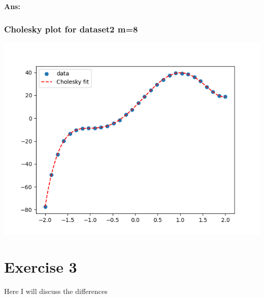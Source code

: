 \documentclass[11pt]{article}
\newenvironment{solbox}
  {\begin{mdframed}[linewidth=1pt,linecolor=black,roundcorner=5pt]
   \noindent\textbf{Ans: }\enspace}
  {\end{mdframed}}
\begin{document}
\begin{solbox}
    \subsubsection{Cholesky plot for dataset2 m=8}

    \begin{center}
    \includegraphics[width=0.75\linewidth]{../Figures/M8Chol_plot_dataset2.png}
    \end{center}



    

\end{solbox}


\section{Exercise 3}

Here I will discuss the differences
\end{document}
